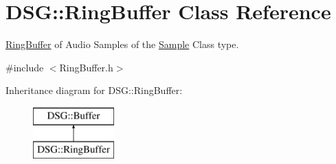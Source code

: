 \hypertarget{classDSG_1_1RingBuffer}{\section{D\+S\+G\+:\+:Ring\+Buffer Class Reference}
\label{classDSG_1_1RingBuffer}
}


\hyperlink{classDSG_1_1RingBuffer}{Ring\+Buffer} of Audio Samples of the \hyperlink{classDSG_1_1Sample}{Sample} Class type.  




{\ttfamily \#include $<$Ring\+Buffer.\+h$>$}

Inheritance diagram for D\+S\+G\+:\+:Ring\+Buffer\+:\begin{figure}[H]
\begin{center}
\leavevmode
\includegraphics[height=2.000000cm]{classDSG_1_1RingBuffer}
\end{center}
\end{figure}
